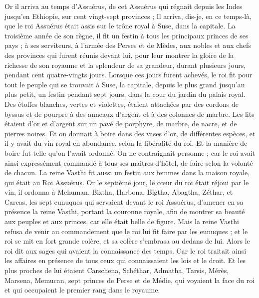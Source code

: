 \begin{multicols}{2}
\VerseOne{}Or il arriva au temps d’Assuérus, de cet Assuérus qui régnait depuis les Indes jusqu'en Ethiopie, sur cent vingt-sept provinces ;
Il arriva, dis-je, en ce temps-là, que le roi Assuérus était assis sur le trône royal à Suse, dans la capitale.
La troisième année de son règne, il fit un festin à tous les principaux princes de ses pays ; à ses serviteurs, à l’armée des Perses et de Mèdes, aux nobles et aux chefs des provinces qui furent réunis devant lui,
pour leur montrer la gloire de la richesse de son royaume et la splendeur de sa grandeur, durant plusieurs jours, pendant cent quatre-vingts jours.
Lorsque ces jours furent achevés, le roi fit pour tout le peuple qui se trouvait à Suse, la capitale, depuis le plus grand jusqu'au plus petit, un festin pendant sept jours, dans la cour du jardin du palais royal.
Des étoffes blanches, vertes et violettes, étaient attachées par des cordons de byssus et de pourpre à des anneaux d'argent et à des colonnes de marbre. Les lits étaient d'or et d'argent sur un pavé de porphyre, de marbre, de nacre, et de pierres noires.
Et on donnait à boire dans des vases d'or, de différentes espèces, et il y avait du vin royal en abondance, selon la libéralité du roi.
Et la manière de boire fut telle qu’on l’avait ordonné. On ne contraignait personne ; car le roi avait ainsi expressément commandé à tous ses maîtres d’hôtel, de faire selon la volonté de chacun.
La reine Vasthi fit aussi un festin aux femmes dans la maison royale, qui était au Roi Assuérus.
Or le septième jour, le cœur du roi était réjoui par le vin, il ordonna à Mehuman, Biztha, Harbona, Bigtha, Abagtha, Zéthar, et Carcas, les sept eunuques qui servaient devant le roi Assuérus,
d’amener en sa présence la reine Vasthi, portant la couronne royale, afin de montrer sa beauté aux peuples et aux princes, car elle était belle de figure.
Mais la reine Vasthi refusa de venir au commandement que le roi lui fit faire par les eunuques ; et le roi se mit en fort grande colère, et sa colère s’embrasa au dedans de lui.
Alors le roi dit aux sages qui avaient la connaissance des temps. Car le roi traitait ainsi les affaires en présence de tous ceux qui connaissaient les lois et le droit.
Et les plus proches de lui étaient Carschena, Schéthar, Admatha, Tarsis, Mérès, Marsena, Memucan, sept princes de Perse et de Médie, qui voyaient la face du roi et qui occupaient le premier rang dans le royaume.

\end{multicols}
